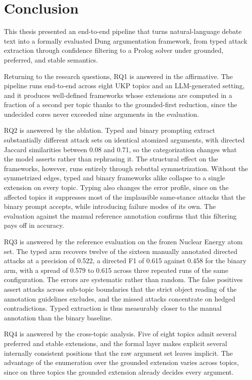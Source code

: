 %
\chapter{Conclusion}
\label{sec:conclusion}

This thesis presented an end-to-end pipeline that turns natural-language debate
text into a formally evaluated Dung argumentation framework, from typed
attack extraction through confidence filtering to a Prolog solver under grounded,
preferred, and stable semantics.

Returning to the research questions, RQ1 is answered in the affirmative. The
pipeline runs end-to-end across eight UKP topics and an LLM-generated setting,
and it produces well-defined frameworks whose extensions are computed in a
fraction of a second per topic thanks to the grounded-first reduction, since
the undecided cores never exceeded nine arguments in the evaluation.

RQ2 is answered by the ablation. Typed and binary prompting extract
substantially different attack sets on identical atomized arguments, with
directed Jaccard similarities between 0.08 and 0.71, so the categorization
changes what the model asserts rather than rephrasing it. The structural effect
on the frameworks, however, runs entirely through rebuttal symmetrization.
Without the symmetrized edges, typed and binary frameworks alike collapse to a
single extension on every topic. Typing also changes the error profile, since
on the affected topics it suppresses most of the implausible same-stance
attacks that the binary prompt accepts, while introducing failure modes of its
own. The evaluation against the manual reference annotation confirms that this
filtering pays off in accuracy.

RQ3 is answered by the reference evaluation on the frozen Nuclear Energy
atom set. The typed arm recovers twelve of the sixteen manually annotated
directed attacks at a precision of 0.522, a directed F1 of 0.615 against 0.458
for the binary arm, with a spread of 0.579 to 0.615 across three repeated runs
of the same configuration. The errors are systematic rather than random. The
false positives assert attacks across sub-topic boundaries that the strict
object reading of the annotation guidelines excludes, and the missed attacks
concentrate on hedged contradictions. Typed extraction is thus measurably
closer to the manual annotation than the binary baseline.

RQ4 is answered by the cross-topic analysis. Five of eight topics admit
several preferred and stable extensions, and the formal layer makes explicit
several internally consistent positions that the raw argument set leaves
implicit. The advantage of the enumeration over the
grounded extension varies across topics, since on three topics the grounded
extension already decides every argument.

